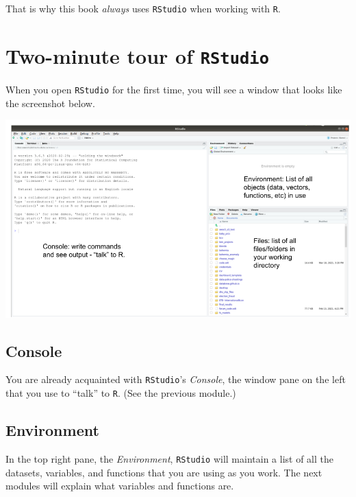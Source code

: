 \documentclass[
]{book}
\begin{document}
That is why this book \emph{always} uses \texttt{RStudio} when working with \texttt{R}.

\hypertarget{two-minute-tour-of-rstudio}{%
\section*{\texorpdfstring{Two-minute tour of \texttt{RStudio}}{Two-minute tour of RStudio}}\label{two-minute-tour-of-rstudio}}

When you open \texttt{RStudio} for the first time, you will see a window that looks like the screenshot below.

\includegraphics{img/rstudio_windows.png}

\hypertarget{console}{%
\subsection*{Console}\label{console}}

You are already acquainted with \texttt{RStudio}'s \emph{Console}, the window pane on the left that you use to ``talk'' to \texttt{R}. (See the previous module.)

\hypertarget{environment}{%
\subsection*{Environment}\label{environment}}

In the top right pane, the \emph{Environment}, \texttt{RStudio} will maintain a list of all the datasets, variables, and functions that you are using as you work. The next modules will explain what variables and functions are.
\end{document}
